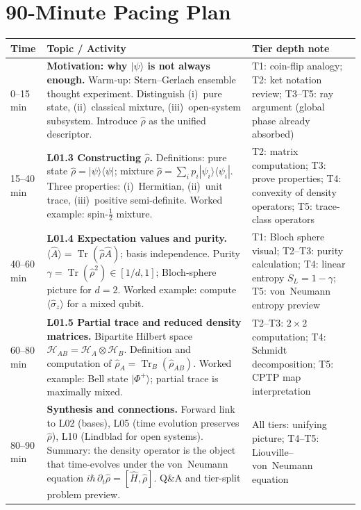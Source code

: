 \documentclass[11pt,a4paper]{article}
\begin{document}
\section{90-Minute Pacing Plan}
\label{sec:L01.2}

\begin{center}
\begin{tabularx}{\textwidth}{p{2.2cm}Xp{3.8cm}}
\toprule
\textbf{Time} & \textbf{Topic / Activity} & \textbf{Tier depth note}\\
\midrule
0--15 min
& \textbf{Motivation: why $|\psi\rangle$ is not always enough.}
  Warm-up: Stern--Gerlach ensemble thought experiment. Distinguish
  (i)~pure state, (ii)~classical mixture, (iii)~open-system subsystem.
  Introduce $\hat{\rho}$ as the unified descriptor.
& T1: coin-flip analogy; T2: ket notation review; T3--T5: ray argument
  (global phase already absorbed)\\
\midrule
15--40 min
& \textbf{L01.3 Constructing $\hat{\rho}$.}
  Definitions: pure state $\hat{\rho}=|\psi\rangle\langle\psi|$; mixture
  $\hat{\rho}=\sum_i p_i|\psi_i\rangle\langle\psi_i|$.
  Three properties: (i)~Hermitian, (ii)~unit trace, (iii)~positive
  semi-definite. Worked example: spin-$\tfrac{1}{2}$ mixture.
& T2: matrix computation; T3: prove properties; T4: convexity of
  density operators; T5: trace-class operators\\
\midrule
40--60 min
& \textbf{L01.4 Expectation values and purity.}
  $\langle\hat{A}\rangle=\operatorname{Tr}(\hat{\rho}\hat{A})$; basis independence.
  Purity $\gamma=\operatorname{Tr}(\hat{\rho}^2)\in[1/d,1]$; Bloch-sphere picture
  for $d=2$. Worked example: compute $\langle\hat{\sigma}_z\rangle$ for a
  mixed qubit.
& T1: Bloch sphere visual; T2--T3: purity calculation; T4: linear
  entropy $S_L=1-\gamma$; T5: von~Neumann entropy preview\\
\midrule
60--80 min
& \textbf{L01.5 Partial trace and reduced density matrices.}
  Bipartite Hilbert space $\mathcal{H}_{AB}=\mathcal{H}_A\otimes\mathcal{H}_B$.
  Definition and computation of $\hat{\rho}_A=\operatorname{Tr}_B(\hat{\rho}_{AB})$.
  Worked example: Bell state $|\Phi^+\rangle$; partial trace is maximally
  mixed.
& T2--T3: $2\!\times\!2$ computation; T4: Schmidt decomposition; T5:
  CPTP map interpretation\\
\midrule
80--90 min
& \textbf{Synthesis and connections.}
  Forward link to L02 (bases), L05 (time evolution preserves $\hat{\rho}$),
  L10 (Lindblad for open systems). Summary: the density operator is the
  object that time-evolves under the von~Neumann equation
  $i\hbar\,\partial_t\hat{\rho}=[\hat{H},\hat{\rho}]$.
  Q\&A and tier-split problem preview.
& All tiers: unifying picture; T4--T5: Liouville--von~Neumann equation\\
\bottomrule
\end{tabularx}
\end{center}
\end{document}
